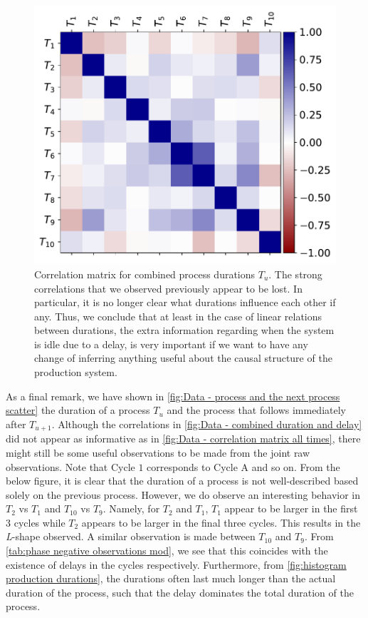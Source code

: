 \documentclass[../Thesis.tex]{subfiles}
\begin{document}
\begin{figure}[H]
    \centering
    \includegraphics[width=.7\linewidth]{figures/Multiple cycles data/Correlation matrix collapsed phases.pdf}
    \caption{Correlation matrix for combined process durations $T_u$. The strong correlations that we observed previously appear to be lost. In particular, it is no longer clear what durations influence each other if any. Thus, we conclude that at least in the case of linear relations between durations, the extra information regarding when the system is idle due to a delay, is very important if we want to have any change of inferring anything useful about the causal structure of the production system.}
    \label{fig:Data - combined duration and delay}
\end{figure}

As a final remark, we have shown in \autoref{fig:Data - process and the next process scatter} the duration of a process $T_u$ and the process that follows immediately after $T_{u+1}$. Although the correlations in \autoref{fig:Data - combined duration and delay} did not appear as informative as in \autoref{fig:Data - correlation matrix all times}, there might still be some useful observations to be made from the joint raw observations. Note that Cycle $1$ corresponds to Cycle A and so on. From the below figure, it is clear that the duration of a process is not well-described based solely on the previous process. However, we do observe an interesting behavior in $T_2$ vs $T_1$ and $T_{10}$ vs $T_9$. Namely, for $T_2$ and $T_1$, $T_1$ appear to be larger in the first $3$ cycles while $T_2$ appears to be larger in the final three cycles. This results in the \textit{L}-shape observed. A similar observation is made between $T_{10}$ and $T_9$. From \autoref{tab:phase negative observations mod}, we see that this coincides with the existence of delays in the cycles respectively. Furthermore, from \autoref{fig:histogram production durations}, the durations often last much longer than the actual duration of the process, such that the delay dominates the total duration of the process.
\end{document}
